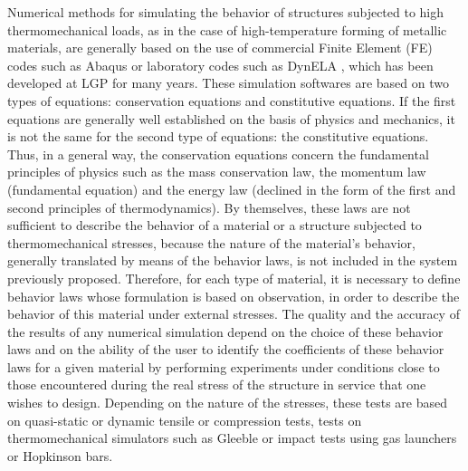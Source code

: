 \documentclass[algorithms,article,submit,pdftex,moreauthors]{Definitions/mdpi}
\begin{document}
Numerical methods for simulating the behavior of structures subjected to high thermomechanical loads, as in the case of high-temperature forming of metallic materials, are generally based on the use of commercial Finite Element (FE) codes such as Abaqus or laboratory codes such as DynELA \cite{Pantale-2004-DOF}, which has been developed at LGP for many years.
These simulation softwares are based on two types of equations: conservation equations and constitutive equations.
If the first equations are generally well established on the basis of physics and mechanics, it is not the same for the second type of equations: the constitutive equations.
Thus, in a general way, the conservation equations concern the fundamental principles of physics such as the mass conservation law, the momentum law (fundamental equation) and the energy law (declined in the form of the first and second principles of thermodynamics).
By themselves, these laws are not sufficient to describe the behavior of a material or a structure subjected to thermomechanical stresses, because the nature of the material's behavior, generally translated by means of the behavior laws, is not included in the system previously proposed.
Therefore, for each type of material, it is necessary to define behavior laws whose formulation is based on observation, in order to describe the behavior of this material under external stresses.
The quality and the accuracy of the results of any numerical simulation depend on the choice of these behavior laws and on the ability of the user to identify the coefficients of these behavior laws for a given material by performing experiments under conditions close to those encountered during the real stress of the structure in service that one wishes to design.
Depending on the nature of the stresses, these tests are based on quasi-static or dynamic tensile or compression tests, tests on thermomechanical simulators such as Gleeble or impact tests using gas launchers or Hopkinson bars.
\end{document}
